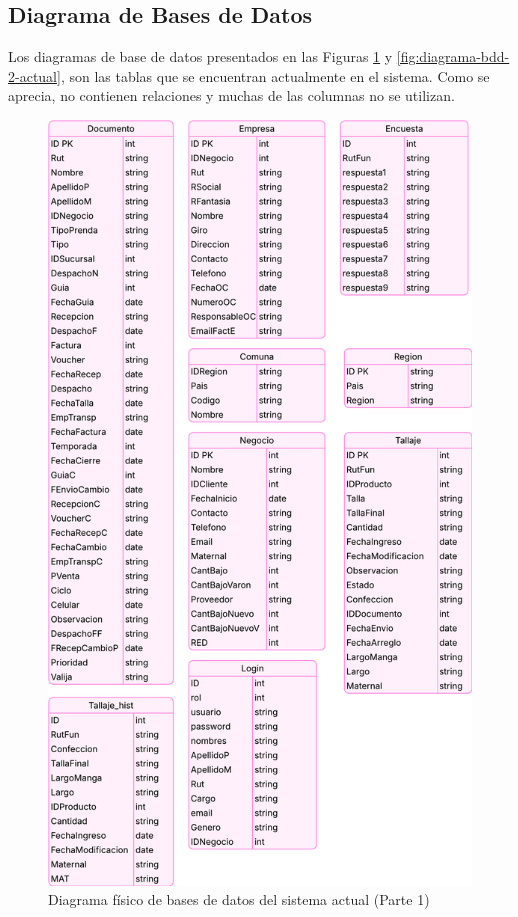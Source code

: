 \subsection{Diagrama de Bases de Datos}

Los diagramas de base de datos presentados en las Figuras \ref{fig:diagrama-bdd-1-actual} y \ref{fig:diagrama-bdd-2-actual}, son las tablas que se encuentran actualmente en el sistema. Como se aprecia, no contienen relaciones y muchas de las columnas no se utilizan.

\begin{figure}[htbp]
    \centering
    \includegraphics[height=0.9\textheight]{figuras/diagramas-actuales/diagrama-bdd-1}
    \caption{Diagrama físico de bases de datos del sistema actual (Parte 1)}
    \label{fig:diagrama-bdd-1-actual}
\end{figure}

